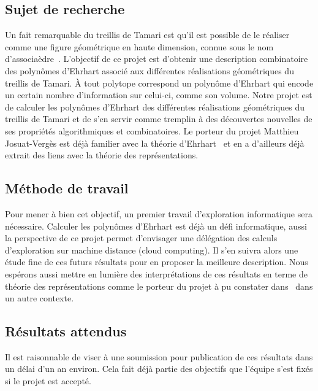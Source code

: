 \documentclass[a4paper, 10pt]{article}
\numberwithin{equation}{subsection}
\begin{document}
\subsection{Sujet de recherche}
Un fait remarquable du treillis de Tamari est qu'il est possible de
le réaliser comme une figure géométrique en haute dimension, connue
sous le nom d'associaèdre~\cite{MR2108555}. L'objectif de ce projet est
d'obtenir une description combinatoire des polynômes d'Ehrhart associé
aux différentes réalisations géométriques du treillis de Tamari.
À tout polytope correspond un polynôme d'Ehrhart qui encode un certain
nombre d'information sur celui-ci, comme son volume. Notre projet est
de calculer les polynômes d'Ehrhart des différentes réalisations
géométriques du treillis de Tamari et de s'en servir comme tremplin
à des découvertes nouvelles de ses propriétés algorithmiques et
combinatoires. Le porteur du projet Matthieu Josuat-Vergès est déjà
familier avec la théorie d'Ehrhart~\cite{MR3484760} et en a d'ailleurs
déjà extrait des liens avec la théorie des représentations.
\medbreak

\subsection{Méthode de travail}
Pour mener à bien cet objectif, un premier travail d'exploration
informatique sera nécessaire. Calculer les polynômes d'Ehrhart est
déjà un défi informatique, aussi la perspective de ce projet
permet d'envisager une délégation des calculs d'exploration sur
machine distance (cloud computing). Il s'en suivra alors une étude
fine de ces futurs résultats pour en proposer la meilleure
description. Nous espérons aussi mettre en lumière des
interprétations de ces résultats en terme de théorie des
représentations comme le porteur du projet à pu constater
dans~\cite{MR3484760} dans un autre contexte.
\medbreak

\subsection{Résultats attendus}
Il est raisonnable de viser à une soumission pour publication de ces
résultats dans un délai d'un an environ. Cela fait déjà partie
des objectifs que l'équipe s'est fixés si le projet est accepté.
\medbreak
\end{document}
